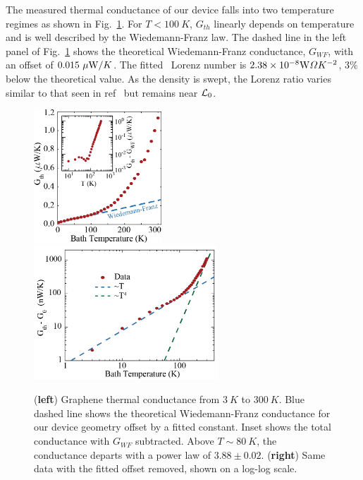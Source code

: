 The measured thermal conductance of our device falls into two temperature regimes as shown in Fig.~\ref{fig:Aria_Gth}. For $T<100~K$, $G_{th}$ linearly depends on temperature and is well described by the Wiedemann-Franz law. The dashed line in the left panel of Fig.~\ref{fig:Aria_Gth} shows the theoretical Wiedemann-Franz conductance, $G_{WF}$, with an offset of $0.015~\mu\mathrm{W}/K$. The fitted~\cite{fong_measurement_2013, yigen_wiedemannfranz_2014} Lorenz number is $2.38\times10^{-8} \mathrm{W}\Omega K^{-2}$, $3\%$ below the theoretical value. As the density is swept, the Lorenz ratio varies similar to that seen in ref~\cite{fong_measurement_2013} but remains near $\mathcal{L}_0$.
\begin{figure}
\centering
\includegraphics[height=50mm, valign=t]{figures/high_density_graphene/Gth_lin.png}
\includegraphics[height=50mm, valign=t]{figures/high_density_graphene/Gth_log.png}
\caption{(\textbf{left}) Graphene thermal conductance from $3~K$ to $300~K$. Blue dashed line shows the theoretical Wiedemann-Franz conductance for our device geometry offset by a fitted constant. Inset shows the total conductance with $G_{WF}$ subtracted. Above $T\sim 80~K$, the conductance departs with a power law of $3.88 \pm 0.02$. (\textbf{right}) Same data with the fitted offset removed, shown on a log-log scale.}
\label{fig:Aria_Gth}
\end{figure}

